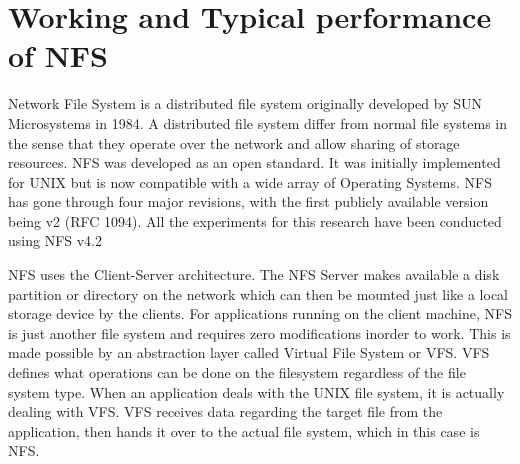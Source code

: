 \documentclass[conference]{IEEEtran}
\begin{document}
\section{Working and Typical performance of NFS}
Network File System is a distributed file system originally developed by
SUN Microsystems in 1984. A distributed file system differ from normal file
systems in the sense that they operate over the network and allow sharing of
storage resources. NFS was developed as an open standard. It was initially
implemented for UNIX but is now compatible with a wide array of Operating
Systems. NFS has gone through four major revisions, with the first publicly
available version being v2 (RFC 1094). All the experiments for this research
have been conducted using NFS v4.2

NFS uses the Client-Server architecture. The NFS Server makes available a
disk partition or directory on the network which can then be mounted just
like a local storage device by the clients. For applications running on the
client machine, NFS is just another file system and requires zero
modifications inorder to work. This is made possible by an abstraction
layer called Virtual File System or VFS. VFS defines what operations can be
done on the filesystem regardless of the file system type. When an
application deals with the UNIX file system, it is actually dealing with
VFS. VFS receives data regarding the target file from the application, then
hands it over to the actual file system, which in this case is NFS.
\end{document}
